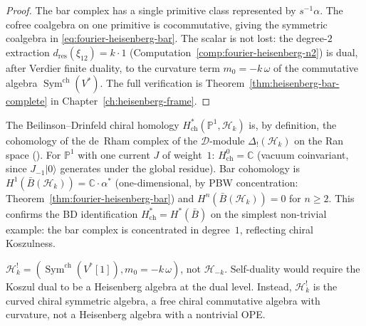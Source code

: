 \begin{proof}
The bar complex has a single primitive class represented by
$s^{-1}\alpha$. The cofree coalgebra on one primitive is
cocommutative, giving the symmetric coalgebra in
\eqref{eq:fourier-heisenberg-bar}. The scalar is not lost: the
degree-$2$ extraction
$d_{\mathrm{res}}(\xi_{12}) = k \cdot 1$
(Computation~\ref{comp:fourier-heisenberg-n2}) is dual, after
Verdier finite duality, to the curvature term
$m_0=-k\,\omega$ of the commutative algebra
$\operatorname{Sym}^{\mathrm{ch}}(V^*)$.
The full verification is Theorem~\ref{thm:heisenberg-bar-complete}
in Chapter~\ref{ch:heisenberg-frame}.
\end{proof}

\begin{remark}
\label{rem:chiral-homology-heisenberg-verification}
The Beilinson--Drinfeld chiral homology
$H^*_{\mathrm{ch}}(\mathbb{P}^1, \mathcal{H}_k)$ is, by
definition, the cohomology of the de~Rham complex of the
$\mathcal{D}$-module $\Delta_!(\mathcal{H}_k)$ on the Ran space
(\cite[\S4.1]{BD04}). For $\mathbb{P}^1$ with one current $J$ of
weight~$1$: $H^0_{\mathrm{ch}} = \mathbb{C}$ (vacuum coinvariant,
since $J_{-1}|0\rangle$ generates under the global residue).
Bar cohomology is $H^1(\bar{B}(\mathcal{H}_k)) = \mathbb{C}\cdot
\alpha^*$ (one-dimensional, by PBW concentration:
Theorem~\ref{thm:fourier-heisenberg-bar}) and
$H^n(\bar{B}(\mathcal{H}_k)) = 0$ for $n \geq 2$. This
confirms the BD identification $H^*_{\mathrm{ch}} = H^*(\bar{B})$
on the simplest non-trivial example: the bar complex is concentrated
in degree~$1$, reflecting chiral Koszulness.
\end{remark}

\begin{remark}
\label{rem:fourier-heisenberg-not-selfdual}
$\mathcal{H}_k^! =
(\operatorname{Sym}^{\mathrm{ch}}(V^*[1]),m_0=-k\,\omega)$, not
$\mathcal{H}_{-k}$. Self-duality would require the Koszul dual to
be a Heisenberg algebra at the dual level. Instead,
$\mathcal{H}_k^!$ is the curved chiral symmetric algebra, a free
chiral commutative algebra with curvature, not a Heisenberg algebra
with a nontrivial OPE.
\end{remark}

